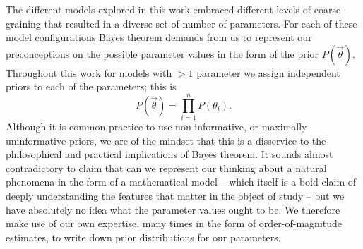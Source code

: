 The different models explored in this work embraced different levels of 
coarse-graining that resulted in a diverse set of number of parameters. For each
of these model configurations Bayes theorem demands from us to represent our 
preconceptions on the possible parameter values in the form of the prior 
$P(\vec{\theta})$. Throughout this work for models with $> 1$ parameter we 
assign independent priors to each of the parameters; this is
\begin{equation}
P(\vec{\theta}) = \prod_{i=1}^n P(\theta_i).
\end{equation}
Although it is common practice to use non-informative, or maximally
uninformative priors, we are of the mindset that this is a disservice to the
philosophical and practical implications of Bayes theorem. It sounds almost
contradictory to claim that can we represent our thinking about a natural
phenomena in the form of a mathematical model -- which itself is a bold claim of
deeply understanding the features that matter in the object of study -- but we
have absolutely no idea what the parameter values ought to be. We therefore make
use of our own expertise, many times in the form of order-of-magnitude
estimates, to write down prior distributions for our parameters.


